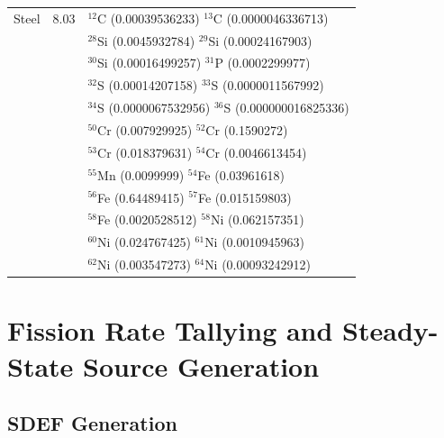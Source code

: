 \begin{table}[h]
\begin{tabular}{ r c l }
\midrule
Steel & 8.03 & $^{12}$C (0.00039536233)  $^{13}$C (0.0000046336713) \\
& &            $^{28}$Si (0.0045932784) $^{29}$Si  (0.00024167903) \\
& &            $^{30}$Si  (0.00016499257) $^{31}$P  (0.0002299977) \\
& &            $^{32}$S  (0.00014207158)  $^{33}$S  (0.0000011567992) \\
& &            $^{34}$S  (0.0000067532956) $^{36}$S  (0.000000016825336) \\
& &            $^{50}$Cr  (0.007929925)   $^{52}$Cr  (0.1590272) \\
& &            $^{53}$Cr  (0.018379631)   $^{54}$Cr  (0.0046613454) \\
& &            $^{55}$Mn  (0.0099999)   $^{54}$Fe  (0.03961618) \\
& &            $^{56}$Fe  (0.64489415)   $^{57}$Fe  (0.015159803) \\
& &            $^{58}$Fe  (0.0020528512)  $^{58}$Ni  (0.062157351) \\
& &            $^{60}$Ni  (0.024767425)  $^{61}$Ni  (0.0010945963) \\
& &            $^{62}$Ni  (0.003547273)  $^{64}$Ni  (0.00093242912) \\
\bottomrule
\end{tabular}
\end{table}

\clearpage

\section{Fission Rate Tallying and Steady-State Source Generation}
\subsection{SDEF Generation}

